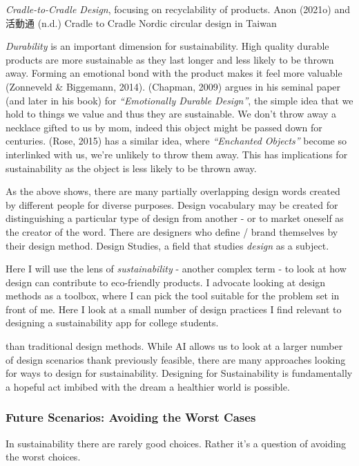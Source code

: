 \documentclass[
  letterpaper,
  DIV=11,
  numbers=noendperiod]{scrartcl}
\begin{document}
\emph{Cradle-to-Cradle Design}, focusing on recyclability of products.
Anon (2021o) and 活動通 (n.d.) Cradle to Cradle Nordic circular design
in Taiwan

\emph{Durability} is an important dimension for sustainability. High
quality durable products are more sustainable as they last longer and
less likely to be thrown away. Forming an emotional bond with the
product makes it feel more valuable (Zonneveld \& Biggemann, 2014).
(Chapman, 2009) argues in his seminal paper (and later in his book) for
\emph{``Emotionally Durable Design''}, the simple idea that we hold to
things we value and thus they are sustainable. We don't throw away a
necklace gifted to us by mom, indeed this object might be passed down
for centuries. (Rose, 2015) has a similar idea, where \emph{``Enchanted
Objects''} become so interlinked with us, we're unlikely to throw them
away. This has implications for sustainability as the object is less
likely to be thrown away.

As the above shows, there are many partially overlapping design words
created by different people for diverse purposes. Design vocabulary may
be created for distinguishing a particular type of design from another -
or to market oneself as the creator of the word. There are designers who
define / brand themselves by their design method. Design Studies, a
field that studies \emph{design} as a subject.

Here I will use the lens of \emph{sustainability} - another complex term
- to look at how design can contribute to eco-friendly products. I
advocate looking at design methods as a toolbox, where I can pick the
tool suitable for the problem set in front of me. Here I look at a small
number of design practices I find relevant to designing a sustainability
app for college students.

than traditional design methods. While AI allows us to look at a larger
number of design scenarios thank previously feasible, there are many
approaches looking for ways to design for sustainability. Designing for
Sustainability is fundamentally a hopeful act imbibed with the dream a
healthier world is possible.

\subsubsection{Future Scenarios: Avoiding the Worst
Cases}\label{future-scenarios-avoiding-the-worst-cases}

In sustainability there are rarely good choices. Rather it's a question
of avoiding the worst choices.
\end{document}
